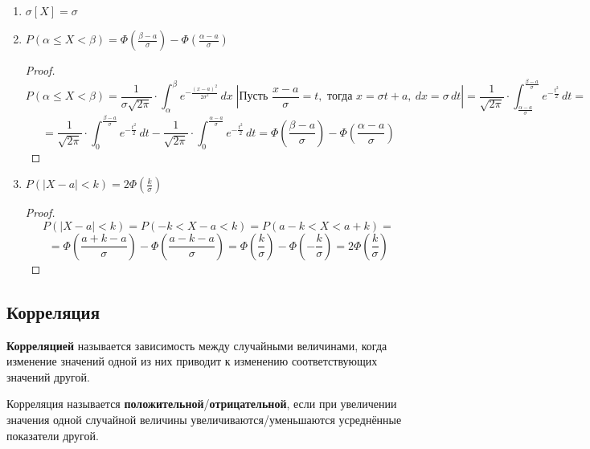 \begin{enumerate}
	\item $\sigma[X] = \sigma$
	
	\item $\displaystyle P(\alpha \leqslant X < \beta) = \Phi\left(\frac{\beta - a}\sigma\right) - \Phi\left(\frac{\alpha - a}\sigma\right)$
	\begin{proof}
	\begin{equation*}
	P(\alpha \leqslant X < \beta) =
	\frac1{\sigma \sqrt{2 \pi}} \cdot \int_\alpha^\beta e^{-\frac{(x - a)^2}{2 \sigma^2}}\,dx \;
	\left| \text{Пусть } \frac{x - a}\sigma = t, \text{ тогда } x = \sigma t + a, \ dx = \sigma\,dt \right| =
	\frac1{\sqrt{2 \pi}} \cdot \int_{\frac{\alpha - a}\sigma}^{\frac{\beta - a}\sigma} e^{-\frac{t^2}2}\,dt =
	\end{equation*}
	\begin{equation*}
	= \frac1{\sqrt{2 \pi}} \cdot \int_0^{\frac{\beta - a}\sigma} e^{-\frac{t^2}2}\,dt - \frac1{\sqrt{2 \pi}} \cdot \int_0^{\frac{\alpha - a}\sigma} e^{-\frac{t^2}2}\,dt =
	\Phi\left(\frac{\beta - a}\sigma\right) - \Phi\left(\frac{\alpha - a}\sigma\right)
	\end{equation*}
	\end{proof}
	
	\item $\displaystyle P(|X - a| < k) = 2 \Phi\left(\frac{k}\sigma\right)$
	\begin{proof}
	\begin{equation*}
	P(|X - a| < k) =
	P(-k < X - a < k) =
	P(a - k < X < a + k) =
	\end{equation*}
	\begin{equation*}
	= \Phi\left(\frac{a + k - a}\sigma\right) - \Phi\left(\frac{a - k - a}\sigma\right) =
	\Phi\left(\frac{k}\sigma\right) - \Phi\left(-\frac{k}\sigma\right) =
	2\Phi\left(\frac{k}\sigma\right)
	\end{equation*}
	\end{proof}
\end{enumerate}

\subsection{Корреляция}
 \textbf{Корреляцией} называется зависимость между случайными величинами, когда изменение значений одной из них приводит к изменению соответствующих значений другой.

Корреляция называется \textbf{положительной}/\textbf{отрицательной}, если при увеличении значения одной случайной величины увеличиваются/уменьшаются усреднённые показатели другой. 

